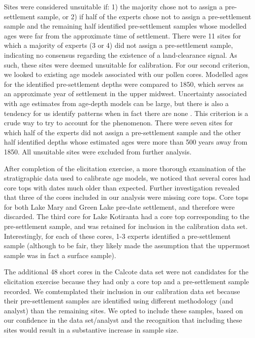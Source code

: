 \documentclass[12pt]{article}
\begin{document}

Sites were considered unsuitable if: 1) the majority chose not to
assign a pre-settlement sample, or 2) if half of the experts chose not
to assign a pre-settlement sample and the remaining half identified
pre-settlement samples whose modelled ages were far from the
approximate time of settlement. There were 11 sites for which a
majority of experts (3 or 4) did not assign a pre-settlement sample,
indicating no consensus regarding the existence of a land-clearance
signal. As such, these sites were deemed unsuitable for
calibration. For our second criterion, we looked to existing age
models associated with our pollen cores. Modelled ages for the
identified pre-settlement depths were compared to 1850, which serves
as an approximate year of settlement in the upper midwest. Uncertainty
associated with age estimates from age-depth models can be large, but
there is also a tendency for us identify patterns when in fact there
are none \cite{XXX}. This criterion is a crude way to try to account
for the phenomenon.  There were seven sites for which half of the
experts did not assign a pre-settlement sample and the other half
identified depths whose estimated ages were more than 500 years away from
1850. All unsuitable sites were excluded from further analysis.

After completion of the elicitation exercise, a more thorough
examination of the stratigraphic data used to calibrate age models, we
noticed that several cores had core tops with dates much older than
expected. Further investigation revealed that three of the cores
included in our analysis were missing core tops. Core tops for both
Lake Mary and Green Lake pre-date settlement, and therefore were
discarded. The third core for Lake Kotiranta had a core top
corresponding to the pre-settlement sample, and was retained for
inclusion in the calibration data set. Interestingly, for each of
these cores, 1-3 experts identified a pre-settlement sample (although
to be fair, they likely made the assumption that the uppermost sample
was in fact a surface sample). 

The additional 48 short cores in the Calcote data set were not candidates for
the elicitation exercise because they had only a core top and a
pre-settlement sample recorded. We comtemplated their inclusion in our
calibration data set because their pre-settlement samples are
identified using different methodology (and analyst) than the
remaining sites. We opted to include these samples, based on our
confidence in the data set/analyst and the recognition that including
these sites would result in a substantive increase in sample size.
\end{document}
